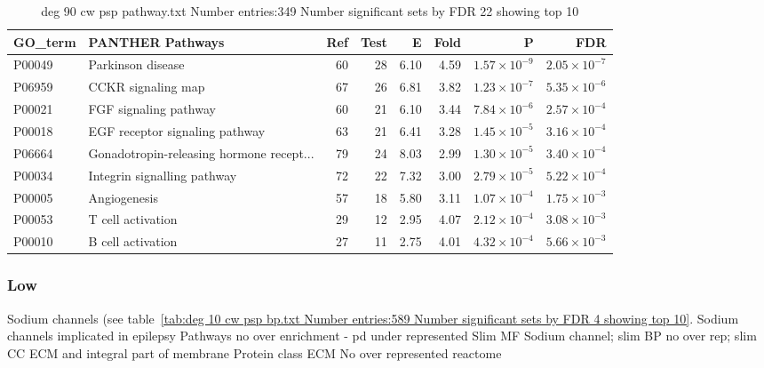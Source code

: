 \begin{table}[ht]
\centering
\begin{tabular}{llrrrrrr}
  \hline
GO\_term & PANTHER Pathways & Ref & Test & E & Fold & P & FDR \\ 
  \hline
  P00049 & Parkinson disease  & 60 & 28 & 6.10 & 4.59 & $1.57 \times 10^{-9}$ & $2.05 \times 10^{-7}$ \\ 
  P06959 & CCKR signaling map  & 67 & 26 & 6.81 & 3.82 & $1.23 \times 10^{-7}$ & $5.35 \times 10^{-6}$ \\ 
  P00021 & FGF signaling pathway  & 60 & 21 & 6.10 & 3.44 & $7.84 \times 10^{-6}$ & $2.57 \times 10^{-4}$ \\ 
  P00018 & EGF receptor signaling pathway  & 63 & 21 & 6.41 & 3.28 & $1.45 \times 10^{-5}$ & $3.16 \times 10^{-4}$ \\ 
  P06664 & Gonadotropin-releasing hormone recept... & 79 & 24 & 8.03 & 2.99 & $1.30 \times 10^{-5}$ & $3.40 \times 10^{-4}$ \\ 
  P00034 & Integrin signalling pathway  & 72 & 22 & 7.32 & 3.00 & $2.79 \times 10^{-5}$ & $5.22 \times 10^{-4}$ \\ 
  P00005 & Angiogenesis  & 57 & 18 & 5.80 & 3.11 & $1.07 \times 10^{-4}$ & $1.75 \times 10^{-3}$ \\ 
  P00053 & T cell activation  & 29 & 12 & 2.95 & 4.07 & $2.12 \times 10^{-4}$ & $3.08 \times 10^{-3}$ \\ 
  P00010 & B cell activation  & 27 & 11 & 2.75 & 4.01 & $4.32 \times 10^{-4}$ & $5.66 \times 10^{-3}$ \\ 
  \hline
\end{tabular}
\caption{deg 90 cw psp pathway.txt Number entries:349 Number significant sets by FDR 22 showing top 10} 
\label{tab:deg 90 cw psp pathway.txt Number entries:349 Number significant sets by FDR 22 showing top 10}
\end{table}
\subsubsection{Low}

Sodium channels (see table~\ref{tab:deg 10 cw psp bp.txt Number entries:589 Number significant sets by FDR 4 showing top 10}. Sodium channels implicated in epilepsy
Pathways no over enrichment - pd under represented
Slim MF Sodium channel; slim BP no over rep; slim CC ECM and integral part of membrane
 Protein class ECM
 No over represented reactome 
 
